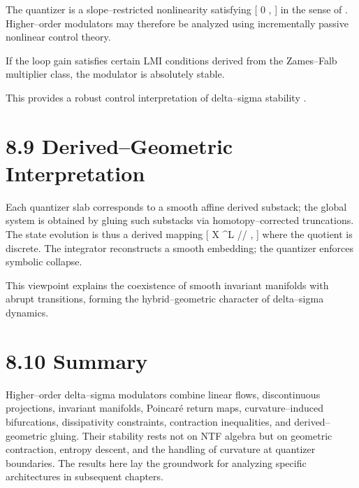 The quantizer is a slope--restricted nonlinearity satisfying
[
0 \le {} ,
]
in the sense of \citet{zames-falb}. Higher--order modulators may therefore be analyzed using incrementally passive nonlinear control theory.

\begin{theorem}
If the loop gain satisfies certain LMI conditions derived from the Zames–Falb multiplier class, the modulator is absolutely stable.
\end{theorem}

This provides a robust control interpretation of delta--sigma stability \citep{zhou1996}.

\section{8.9 Derived–Geometric Interpretation}

Each quantizer slab corresponds to a smooth affine derived substack; the global system is obtained by gluing such substacks via homotopy--corrected truncations. The state evolution is thus a derived mapping
[
X \longrightarrow {}^L // \Lambda,
]
where the quotient is discrete. The integrator reconstructs a smooth embedding; the quantizer enforces symbolic collapse.

This viewpoint explains the coexistence of smooth invariant manifolds with abrupt transitions, forming the hybrid–geometric character of delta--sigma dynamics.

\section{8.10 Summary}

Higher--order delta--sigma modulators combine linear flows, discontinuous projections, invariant manifolds, Poincaré return maps, curvature--induced bifurcations, dissipativity constraints, contraction inequalities, and derived–geometric gluing. Their stability rests not on NTF algebra but on geometric contraction, entropy descent, and the handling of curvature at quantizer boundaries. The results here lay the groundwork for analyzing specific architectures in subsequent chapters.
